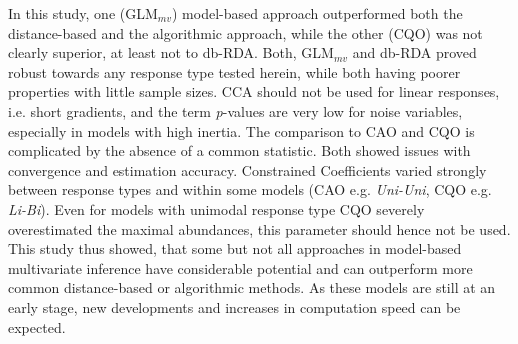 
	In this study, one (GLM$_{mv}$) model-based approach outperformed both the distance-based and the algorithmic approach, while the other (CQO) was not clearly superior, at least not to db-RDA.
	Both, GLM$_{mv}$ and db-RDA proved robust towards any response type tested herein, while both having poorer properties with little sample sizes. 
	CCA should not be used for linear responses, i.e. short gradients, and the term \textit{p}-values are very low for noise variables, especially in models with high inertia. 
	The comparison to CAO and CQO is complicated by the absence of a common statistic. 
	Both showed issues with convergence and estimation accuracy. 
	Constrained Coefficients varied strongly between response types and within some models (CAO e.g. \textit{Uni-Uni}, CQO e.g. \textit{Li-Bi}). 
	Even for models with unimodal response type CQO severely overestimated the maximal abundances, this parameter should hence not be used. 
	This study thus showed, that some but not all approaches in model-based multivariate inference have considerable potential and can outperform more common distance-based or algorithmic methods. 
	As these models are still at an early stage, new developments and increases in computation speed can be expected.   
	\\

	
